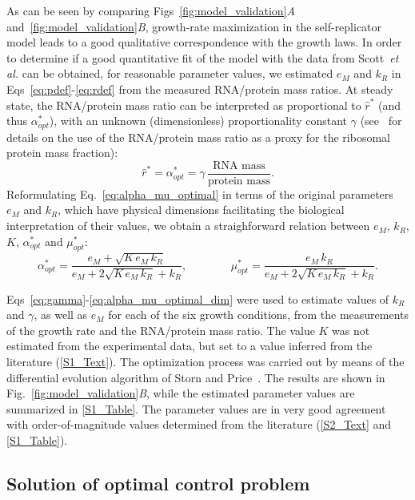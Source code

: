 As can be seen by comparing Figs~\ref{fig:model_validation}\textit{A} and~\ref{fig:model_validation}\textit{B}, growth-rate maximization in the self-replicator model leads to a good qualitative correspondence with the growth laws.
In order to determine if a good quantitative fit of the model with the data from Scott~\textit{et al.} \cite{scott_interdependence_2010} can be obtained, for reasonable parameter values, we estimated $e_M$ and $k_R$ in Eqs~\ref{eq:pdef}-\ref{eq:rdef} from the measured RNA/protein mass ratios.
At steady state, the RNA/protein mass ratio can be interpreted as proportional to $\hat{r}^*$ (and thus $\alpha_{opt}^*$), with an unknown (dimensionless) proportionality constant $\gamma$ (see~\cite{scott_interdependence_2010} for details on the use of the RNA/protein mass ratio as a proxy for the ribosomal protein mass fraction):
\begin{equation}
\hat{r}^* = \alpha_{opt}^* = \gamma \, \frac{\text{RNA mass}}{\text{protein mass}}.
\label{eq:gamma}
\end{equation}
Reformulating Eq.~\ref{eq:alpha_mu_optimal} in terms of the original parameters $e_M$ and $k_R$, which have physical dimensions facilitating the biological interpretation of their values, we obtain a straighforward relation between $e_M$, $k_R$, $K$, $\alpha_{opt}^*$ and $\mu_{opt}^*$:
\begin{equation}
\label{eq:alpha_mu_optimal_dim}
\alpha_{opt}^* = \frac{e_M + \sqrt{K\, e_M\, k_R}}{e_M + 2\sqrt{K\, e_M\, k_R} + k_R}
, \;\;\;\;\;\;\;\;\;\;\;\;\;\; 
\mu^*_{opt} = \frac{e_M \, k_R}{e_M + 2\sqrt{K\, e_M\, k_R} + k_R}.
\end{equation}

Eqs~\ref{eq:gamma}-\ref{eq:alpha_mu_optimal_dim} were used to estimate values of $k_R$ and $\gamma$, as well as $e_M$ for each of the six growth conditions, from the measurements of the growth rate and the RNA/protein mass ratio. 
The value $K$ was not estimated from the experimental data, but set to a value inferred from the literature (\ref{S1_Text}).
The optimization process was carried out by means of the differential evolution algorithm of Storn and Price~\cite{storn_differential_1997}.
The results are shown in Fig.~\ref{fig:model_validation}\textit{B}, while the estimated parameter values are summarized in \ref{S1_Table}.
The parameter values are in very good agreement with order-of-magnitude values determined from the literature (\ref{S2_Text} and \ref{S1_Table}). 

\subsection{Solution of optimal control problem}

